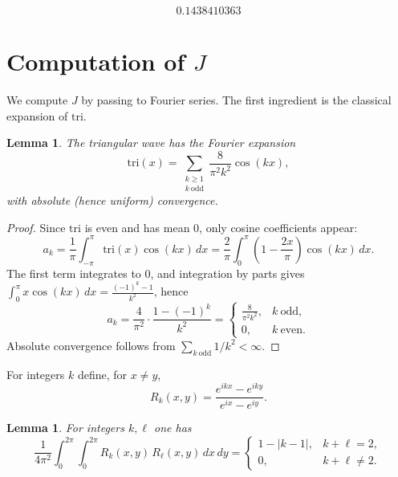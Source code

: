 \documentclass{article}
\newtheorem{lem}[thr]{Lemma}
\theoremstyle{definition}
\let\ge\geqslant
\begin{document}
\begin{dmath}\label{(7)''}
 0.1438410363
\end{dmath}







\section{Computation of $J$ }\label{app:comp_J}








We compute $J$ by passing to Fourier series. The first ingredient is the classical expansion of $\mathrm{tri}$.

\begin{lem}\label{lem:triFourier}
The triangular wave has the Fourier expansion
\[
\mathrm{tri}(x)=\sum_{\substack{k\ge1\\ k\ \mathrm{odd}}}\frac{8}{\pi^2k^2}\cos(kx),
\]
with absolute (hence uniform) convergence.
\end{lem}

\begin{proof}
Since $\mathrm{tri}$ is even and has mean $0$, only cosine coefficients appear:
\[
a_k=\frac{1}{\pi}\int_{-\pi}^{\pi}\mathrm{tri}(x)\cos(kx)\,dx
=\frac{2}{\pi}\int_0^{\pi}\left(1-\frac{2x}{\pi}\right)\cos(kx)\,dx.
\]
The first term integrates to $0$, and integration by parts gives
$\int_0^\pi x\cos(kx)\,dx=\frac{(-1)^k-1}{k^2}$, hence
\[
a_k=\frac{4}{\pi^2}\cdot\frac{1-(-1)^k}{k^2}
=
\begin{cases}
\frac{8}{\pi^2k^2},& k\ \text{odd},\\
0,& k\ \text{even}.
\end{cases}
\]
Absolute convergence follows from $\sum_{k\ \mathrm{odd}}1/k^2<\infty$.
\end{proof}

For integers $k$ define, for $x\neq y$,
\[
R_k(x,y)=\frac{e^{ikx}-e^{iky}}{e^{ix}-e^{iy}}.
\]

\begin{lem}\label{lem:RkIntegral}
For integers $k,\ell$ one has
\[
\frac{1}{4\pi^2}\int_0^{2\pi}\int_0^{2\pi} R_k(x,y)\,R_\ell(x,y)\,dx\,dy
=
\begin{cases}
1-|k-1|,& k+\ell=2,\\
0,& k+\ell\neq 2.
\end{cases}
\]
\end{lem}
\end{document}
